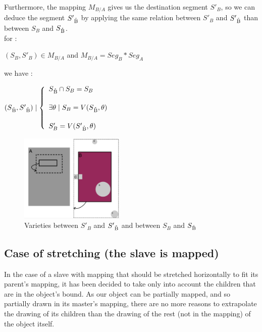 \documentclass[a4paper]{article}
\begin{document}
Furthermore, the mapping $M_{B/A}$ gives us the destination segment $S'_B$, so we can deduce the segment $S'\textsubscript{\r{B}}$ by applying the same relation between $S'_B$ and $S'\textsubscript{\r{B}}$ than between $S_B$ and $S\textsubscript{\r{B}}$.
\\

for : \begin{center} $(S_B, S'_B) \in M_{B/A}$ and $M_{B/A} = Seg_B * Seg_A$ \end{center}

we have :

\begin{center}
$(S\textsubscript{\r{B}}, S'\textsubscript{\r{B}}) \mid \left\lbrace 
\begin{array}{lcl} 
S\textsubscript{\r{B}} \cap S_B = S_B\\ [0.5cm]
\exists \theta \mid S_B = V(S\textsubscript{\r{B}}, \theta)\\ [0.5cm]
S'_B = V(S'\textsubscript{\r{B}}, \theta)
\end{array}\right.$
\end{center}

\begin{figure}[h]
\begin{center}
\includegraphics[width=50mm]{img/exemple3.png} 
\caption{Varieties between $S'_B$ and $S'\textsubscript{\r{B}}$ and between $S_B$ and $S\textsubscript{\r{B}}$}
\label{fig:mapping}
\end{center}
\end{figure}

\subsection{Case of stretching (the slave is mapped)}\label{subsec:complexMap}

In the case of a slave with mapping that should be stretched horizontally to fit its parent's mapping, it has been decided to take only into account the children that are in the object's bound.
As our object can be partially mapped, and so partially drawn in its master's mapping, there are no more reasons to extrapolate the drawing of its children than the drawing of the rest (not in the mapping) of the object itself.
\end{document}
